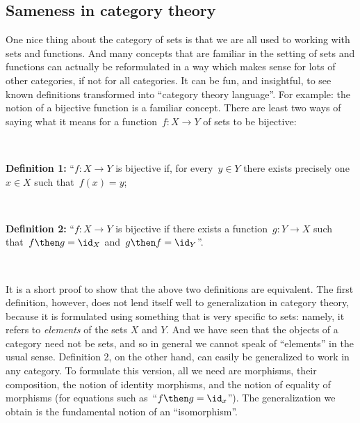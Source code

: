 \label{sec:attributes_sameness}

\subsection{Sameness in category theory}


One nice thing about the category of sets is that we are all used to working with sets and functions. And many concepts that are familiar in the setting of sets and functions can actually be reformulated in a way which makes sense for lots of other categories, if not for all categories. It can be fun, and insightful, to see known definitions transformed into ``category theory language''. For example: the notion of a bijective function is a familiar concept. There are least two ways of saying what it means for a function~$f \colon X \to Y$ of sets to be bijective:

\

\textbf{Definition 1:} ``$f\colon X \to Y$ is bijective if, for every~$y \in Y$ there exists precisely one~$x \in X$ such that~$f(x) = y$; 

\

\textbf{Definition 2:} ``$f\colon X \to Y$ is bijective if there exists a function~$g\colon Y \rightarrow X$ such that~$f \then g = \id_X$ and~$g \then f = \id_Y$''.

\


It is a short proof to show that the above two definitions are equivalent. The first definition, however, does not lend itself well to generalization in category theory, because it is formulated using something that is very specific to sets: namely, it refers to \emph{elements} of the sets $X$ and $Y$. And we have seen that the objects of a category need not be sets, and so in general we cannot speak of ``elements'' in the usual sense. Definition 2, on the other hand, can easily be generalized to work in any category. To formulate this version, all we need are morphisms, their composition, the notion of identity morphisms, and the notion of equality of morphisms (for equations such as~``$f \then g = \id_x$''). The generalization we obtain is the fundamental notion of an ``isomorphism''.


 
